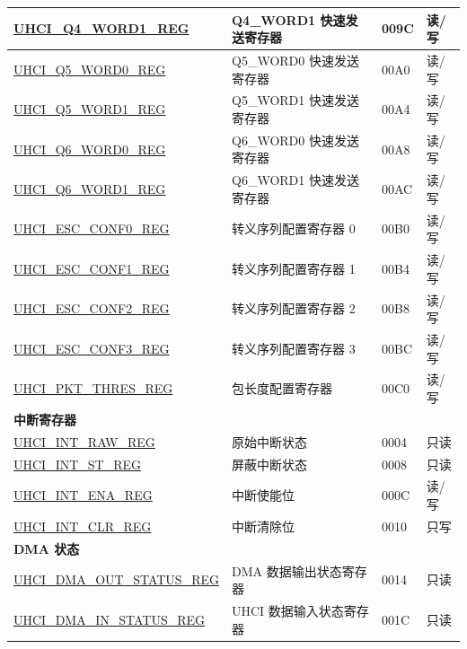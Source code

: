 \begin{longtable}{ | p{6cm} | p{7.2cm} | p{1.3cm} | p{1cm} | }
\hyperref[regdesc:UHCIQ4WORD1REG]{UHCI\_Q4\_WORD1\_REG} & Q4\_WORD1 快速发送寄存器 & \hexprefix{}009C & 读/写 \\ \hline
\hyperref[regdesc:UHCIQ5WORD0REG]{UHCI\_Q5\_WORD0\_REG} & Q5\_WORD0 快速发送寄存器 & \hexprefix{}00A0 & 读/写 \\ \hline
\hyperref[regdesc:UHCIQ5WORD1REG]{UHCI\_Q5\_WORD1\_REG} & Q5\_WORD1 快速发送寄存器 & \hexprefix{}00A4 & 读/写 \\ \hline
\hyperref[regdesc:UHCIQ6WORD0REG]{UHCI\_Q6\_WORD0\_REG} & Q6\_WORD0 快速发送寄存器 & \hexprefix{}00A8 & 读/写 \\ \hline
\hyperref[regdesc:UHCIQ6WORD1REG]{UHCI\_Q6\_WORD1\_REG} & Q6\_WORD1 快速发送寄存器 & \hexprefix{}00AC & 读/写 \\ \hline
\hyperref[regdesc:UHCIESCCONF0REG]{UHCI\_ESC\_CONF0\_REG} & 转义序列配置寄存器 0 & \hexprefix{}00B0 & 读/写 \\ \hline
\hyperref[regdesc:UHCIESCCONF1REG]{UHCI\_ESC\_CONF1\_REG} & 转义序列配置寄存器 1 & \hexprefix{}00B4 & 读/写 \\ \hline
\hyperref[regdesc:UHCIESCCONF2REG]{UHCI\_ESC\_CONF2\_REG} & 转义序列配置寄存器 2 & \hexprefix{}00B8 & 读/写 \\ \hline
\hyperref[regdesc:UHCIESCCONF3REG]{UHCI\_ESC\_CONF3\_REG} & 转义序列配置寄存器 3 & \hexprefix{}00BC & 读/写 \\ \hline
\hyperref[regdesc:UHCIPKTTHRESREG]{UHCI\_PKT\_THRES\_REG} & 包长度配置寄存器 & \hexprefix{}00C0 & 读/写 \\ \hline
\multicolumn{4}{|l|}{\textbf{中断寄存器}} \\ \hline
\hyperref[regdesc:UHCIINTRAWREG]{UHCI\_INT\_RAW\_REG} & 原始中断状态 & \hexprefix{}0004 & 只读 \\ \hline
\hyperref[regdesc:UHCIINTSTREG]{UHCI\_INT\_ST\_REG} & 屏蔽中断状态 & \hexprefix{}0008 & 只读 \\ \hline
\hyperref[regdesc:UHCIINTENAREG]{UHCI\_INT\_ENA\_REG} & 中断使能位 & \hexprefix{}000C & 读/写 \\ \hline
\hyperref[regdesc:UHCIINTCLRREG]{UHCI\_INT\_CLR\_REG} & 中断清除位 & \hexprefix{}0010 & 只写 \\ \hline
\multicolumn{4}{|l|}{\textbf{DMA 状态}} \\ \hline
\hyperref[regdesc:UHCIDMAOUTSTATUSREG]{UHCI\_DMA\_OUT\_STATUS\_REG} & DMA 数据输出状态寄存器 & \hexprefix{}0014 & 只读 \\ \hline
\hyperref[regdesc:UHCIDMAINSTATUSREG]{UHCI\_DMA\_IN\_STATUS\_REG} & UHCI 数据输入状态寄存器 & \hexprefix{}001C & 只读 \\ \hline

\end{longtable}
